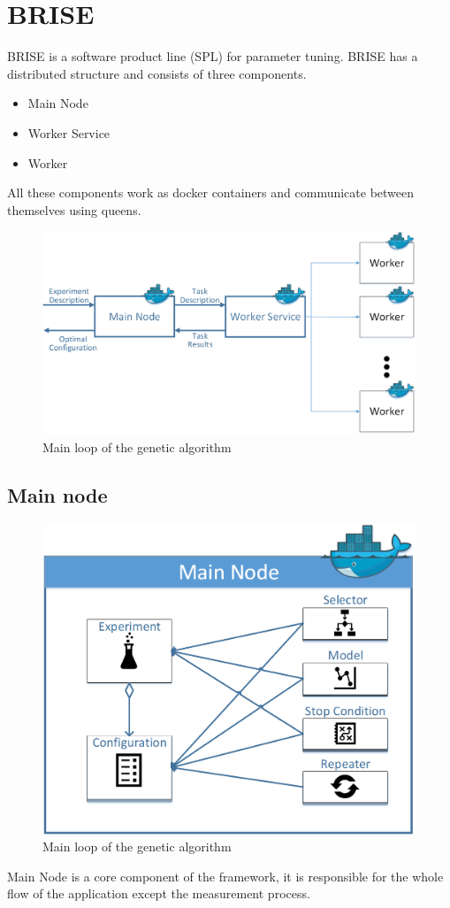 \section{BRISE}
BRISE is a software product line (SPL) for parameter tuning.
BRISE has a distributed structure and consists of three components.
\begin{itemize}
	\item Main Node
	\item Worker Service
	\item Worker
\end{itemize}
All these components work as docker containers and communicate between themselves using queens. 
\begin{figure}
	\centering
	\includegraphics[width=\textwidth]{images/BRISEarch.png}
	\caption{Main loop of the genetic algorithm}
	\label{fig:BRISEarch}
\end{figure}

\subsection{Main node}
\begin{figure}
	\centering
	\includegraphics[width=\textwidth]{images/BRISEMain.png}
	\caption{Main loop of the genetic algorithm}
	\label{fig:BRISEMain}
\end{figure}
Main Node is a core component of the framework, it is responsible for the whole flow of the application except the measurement process.~\cite{pukhkaiev19} 

